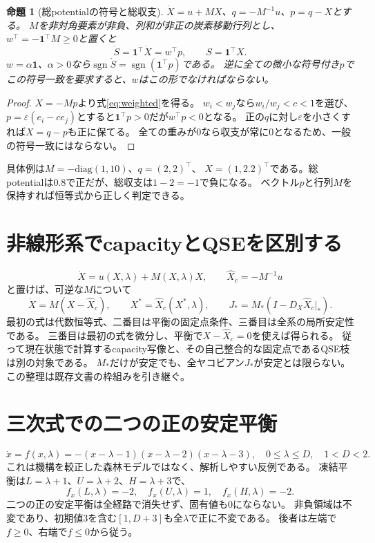 \documentclass[a4paper,11pt]{ltjsarticle}
\newtheorem{proposition}{命題}
\newcommand{\one}{\bm 1}
\begin{document}
\begin{proposition}[総potentialの符号と総収支]
$\dot X=u+MX$、$q=-M^{-1}u$、$p=q-X$とする。
$M$を非対角要素が非負、列和が非正の炭素移動行列とし、
$w^\top=-\one^\top M\ge0$と置くと
\begin{equation}
\dot S=\one^\top\dot X=w^\top p,\qquad S=\one^\top X.
\label{eq:weighted}
\end{equation}
$w=\alpha\one$、$\alpha>0$なら$\operatorname{sgn}\dot S
=\operatorname{sgn}(\one^\top p)$である。
逆に全ての微小な符号付き$p$でこの符号一致を要求すると、$w$はこの形でなければならない。
\end{proposition}
\begin{proof}
$\dot X=-Mp$より式\eqref{eq:weighted}を得る。
$w_i<w_j$なら$w_i/w_j<c<1$を選び、
$p=\varepsilon(e_i-ce_j)$とすると$\one^\top p>0$だが$w^\top p<0$となる。
正の$q$に対し$\varepsilon$を小さくすれば$X=q-p$も正に保てる。
全ての重みが0なら収支が常に0となるため、一般の符号一致にはならない。
\end{proof}
具体例は$M=-\mathrm{diag}(1,10)$、$q=(2,2)^\top$、
$X=(1,2.2)^\top$である。総potentialは0.8で正だが、総収支は$1-2=-1$で負になる。
ベクトル$p$と行列$M$を保持すれば恒等式から正しく判定できる。

\section{非線形系でcapacityとQSEを区別する}
\[
\dot X=u(X,\lambda)+M(X,\lambda)X,\qquad
\widehat X_c=-M^{-1}u
\]
と置けば、可逆な$M$について
\begin{equation}
\dot X=M(X-\widehat X_c),\qquad
X^*=\widehat X_c(X^*,\lambda),\qquad
J_*=M_*(I-D_X\widehat X_c|_*).
\label{eq:capacity}
\end{equation}
最初の式は代数恒等式、二番目は平衡の固定点条件、三番目は全系の局所安定性である。
三番目は最初の式を微分し、平衡で$X-\widehat X_c=0$を使えば得られる。
従って現在状態で計算するcapacity写像と、その自己整合的な固定点であるQSE枝は別の対象である。
$M_*$だけが安定でも、全ヤコビアン$J_*$が安定とは限らない。
この整理は既存文書の枠組みを引き継ぐ。

\section{三次式での二つの正の安定平衡}
\begin{equation}
\dot x=f(x,\lambda)=-(x-\lambda-1)(x-\lambda-2)(x-\lambda-3),
\quad 0\le\lambda\le D,\quad 1<D<2.
\label{eq:cubic}
\end{equation}
これは機構を較正した森林モデルではなく、解析しやすい反例である。
凍結平衡は$L=\lambda+1$、$U=\lambda+2$、$H=\lambda+3$で、
\[
f_x(L,\lambda)=-2,\quad f_x(U,\lambda)=1,\quad f_x(H,\lambda)=-2.
\]
二つの正の安定平衡は全経路で消失せず、固有値も0にならない。
非負領域は不変であり、初期値3を含む$[1,D+3]$も全$\lambda$で正に不変である。
後者は左端で$f\ge0$、右端で$f\le0$から従う。
\end{document}
